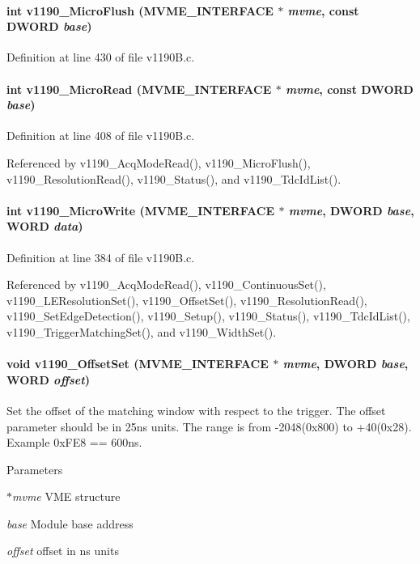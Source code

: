 \paragraph[{v1190\_\-MicroFlush}]{\setlength{\rightskip}{0pt plus 5cm}int v1190\_\-MicroFlush ({\bf MVME\_\-INTERFACE} $\ast$ {\em mvme}, \/  const {\bf DWORD} {\em base})}\hfill\label{v1190B_8h_aa6115ff03a198f775fd364cf4cb191fe}


Definition at line 430 of file v1190B.c.
\paragraph[{v1190\_\-MicroRead}]{\setlength{\rightskip}{0pt plus 5cm}int v1190\_\-MicroRead ({\bf MVME\_\-INTERFACE} $\ast$ {\em mvme}, \/  const {\bf DWORD} {\em base})}\hfill\label{v1190B_8h_a25b20b373e9dad2da095572a6b66d7db}


Definition at line 408 of file v1190B.c.

Referenced by v1190\_\-AcqModeRead(), v1190\_\-MicroFlush(), v1190\_\-ResolutionRead(), v1190\_\-Status(), and v1190\_\-TdcIdList().
\paragraph[{v1190\_\-MicroWrite}]{\setlength{\rightskip}{0pt plus 5cm}int v1190\_\-MicroWrite ({\bf MVME\_\-INTERFACE} $\ast$ {\em mvme}, \/  {\bf DWORD} {\em base}, \/  {\bf WORD} {\em data})}\hfill\label{v1190B_8h_a667677df1f9f764336db2953dc1e27b9}


Definition at line 384 of file v1190B.c.

Referenced by v1190\_\-AcqModeRead(), v1190\_\-ContinuousSet(), v1190\_\-LEResolutionSet(), v1190\_\-OffsetSet(), v1190\_\-ResolutionRead(), v1190\_\-SetEdgeDetection(), v1190\_\-Setup(), v1190\_\-Status(), v1190\_\-TdcIdList(), v1190\_\-TriggerMatchingSet(), and v1190\_\-WidthSet().
\paragraph[{v1190\_\-OffsetSet}]{\setlength{\rightskip}{0pt plus 5cm}void v1190\_\-OffsetSet ({\bf MVME\_\-INTERFACE} $\ast$ {\em mvme}, \/  {\bf DWORD} {\em base}, \/  {\bf WORD} {\em offset})}\hfill\label{v1190B_8h_a47b04f666b0640f4ec4b5b03a78bcff5}
Set the offset of the matching window with respect to the trigger. The offset parameter should be in 25ns units. The range is from -\/2048(0x800) to +40(0x28). Example 0xFE8 == 600ns. 
\begin{DoxyParams}{Parameters}
\item[{\em $\ast$mvme}]VME structure \item[{\em base}]Module base address \item[{\em offset}]offset in ns units \end{DoxyParams}


